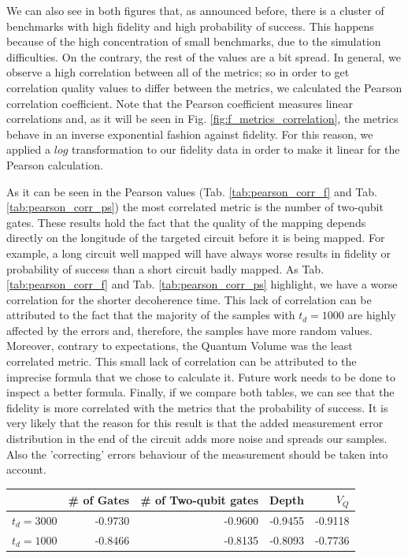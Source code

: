 We can also see in both figures that, as announced before, there is a cluster of benchmarks with high fidelity and high probability of success.
This happens because of the high concentration of small benchmarks, due to the simulation difficulties.
On the contrary, the rest of the values are a bit spread.
In general, we observe a high correlation between all of the metrics; so in order to get correlation quality values to differ between the metrics, we calculated the Pearson correlation coefficient.
Note that the Pearson coefficient measures linear correlations and, as it will be seen in Fig. \ref{fig:f_metrics_correlation}, the metrics behave in an inverse exponential fashion against fidelity.
For this reason, we applied a \(log\) transformation to our fidelity data in order to make it linear for the Pearson calculation.


As it can be seen in the Pearson values (Tab. \ref{tab:pearson_corr_f} and Tab. \ref{tab:pearson_corr_ps}) the most correlated metric is the number of two-qubit gates.
These results hold the fact that the quality of the mapping depends directly on the longitude of the targeted circuit before it is being mapped.
For example, a long circuit well mapped will have always worse results in fidelity or probability of success than a short circuit badly mapped.
As Tab. \ref{tab:pearson_corr_f} and Tab. \ref{tab:pearson_corr_ps} highlight, we have a worse correlation for the shorter decoherence time.
This lack of correlation can be attributed to the fact that the majority of the samples with \(t_d = 1000\) are highly affected by the errors and, therefore, the samples have more random values.
Moreover, contrary to expectations, the Quantum Volume was the least correlated metric.
This small lack of correlation can be attributed to the imprecise formula that we chose to calculate it.
Future work needs to be done to inspect a better formula.
Finally, if we compare both tables, we can see that the fidelity is more correlated with the metrics that the probability of success.
It is very likely that the reason for this result is that the added measurement error distribution in the end of the circuit adds more noise and spreads our samples.
Also the 'correcting' errors behaviour of the measurement should be taken into account.

\begin{center}
\begin{tabular}{lrrrr}
 & \# of Gates & \# of Two-qubit gates & Depth & \(V_Q\)\\
\hline
\(t_d = 3000\) & -0.9730 & -0.9600 & -0.9455 & -0.9118\\
\(t_d = 1000\) & -0.8466 & -0.8135 & -0.8093 & -0.7736\\
\hline
\end{tabular}
\end{center}

